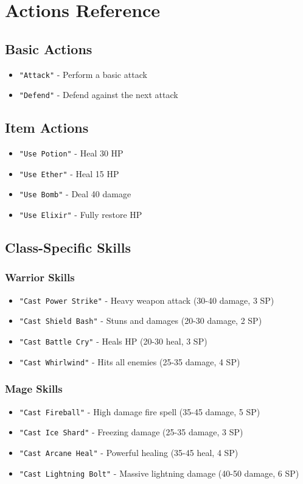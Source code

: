 \documentclass[12pt]{article}
\begin{document}
\section{Actions Reference}
\label{sec:actions}

\subsection{Basic Actions}
\begin{itemize}
    \item \texttt{"Attack"} - Perform a basic attack
    \item \texttt{"Defend"} - Defend against the next attack
\end{itemize}

\subsection{Item Actions}
\begin{itemize}
    \item \texttt{"Use Potion"} - Heal 30 HP
    \item \texttt{"Use Ether"} - Heal 15 HP  
    \item \texttt{"Use Bomb"} - Deal 40 damage
    \item \texttt{"Use Elixir"} - Fully restore HP
\end{itemize}

\subsection{Class-Specific Skills}
\label{subsec:skills}

\subsubsection{Warrior Skills}
\begin{itemize}
    \item \texttt{"Cast Power Strike"} - Heavy weapon attack (30-40 damage, 3 SP)
    \item \texttt{"Cast Shield Bash"} - Stuns and damages (20-30 damage, 2 SP)
    \item \texttt{"Cast Battle Cry"} - Heals HP (20-30 heal, 3 SP)
    \item \texttt{"Cast Whirlwind"} - Hits all enemies (25-35 damage, 4 SP)
\end{itemize}

\subsubsection{Mage Skills}
\begin{itemize}
    \item \texttt{"Cast Fireball"} - High damage fire spell (35-45 damage, 5 SP)
    \item \texttt{"Cast Ice Shard"} - Freezing damage (25-35 damage, 3 SP)
    \item \texttt{"Cast Arcane Heal"} - Powerful healing (35-45 heal, 4 SP)
    \item \texttt{"Cast Lightning Bolt"} - Massive lightning damage (40-50 damage, 6 SP)
\end{itemize}
\end{document}
